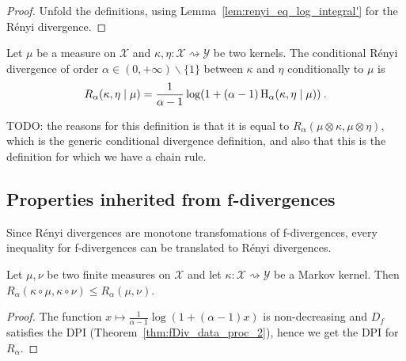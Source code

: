 \begin{proof}\leanok
{}
Unfold the definitions, using Lemma~\ref{lem:renyi_eq_log_integral'} for the Rényi divergence.
\end{proof}


\begin{definition}
  \label{def:condRenyi}
  \leanok
  Let $\mu$ be a measure on $\mathcal X$ and $\kappa, \eta : \mathcal X \rightsquigarrow \mathcal Y$ be two kernels. The conditional Rényi divergence of order $\alpha \in (0,+\infty) \backslash \{1\}$ between $\kappa$ and $\eta$ conditionally to $\mu$ is
  \begin{align*}
  R_\alpha(\kappa, \eta \mid \mu) =\frac{1}{\alpha - 1} \log (1 + (\alpha - 1) \operatorname{H}_\alpha(\kappa, \eta \mid \mu)) \: .
  \end{align*}
\end{definition}

TODO: the reasons for this definition is that it is equal to $R_\alpha(\mu \otimes \kappa, \mu \otimes \eta)$, which is the generic conditional divergence definition, and also that this is the definition for which we have a chain rule.

\subsection{Properties inherited from f-divergences}

Since Rényi divergences are monotone transfomations of f-divergences, every inequality for f-divergences can be translated to Rényi divergences.

\begin{theorem}
  \label{thm:renyi_data_proc}
  \leanok
  Let $\mu, \nu$ be two finite measures on $\mathcal X$ and let $\kappa : \mathcal X \rightsquigarrow \mathcal Y$ be a Markov kernel.
  Then $R_\alpha(\kappa \circ \mu, \kappa \circ \nu) \le R_\alpha(\mu, \nu)$.
\end{theorem}

\begin{proof} \leanok
{}
The function $x \mapsto \frac{1}{\alpha - 1}\log (1 + (\alpha - 1)x)$ is non-decreasing and $D_f$ satisfies the DPI (Theorem~\ref{thm:fDiv_data_proc_2}), hence we get the DPI for $R_\alpha$.
\end{proof}

